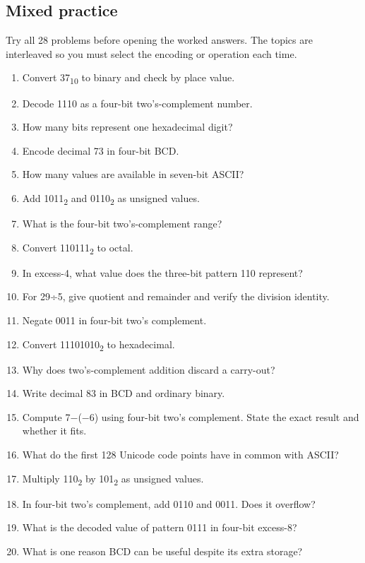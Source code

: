 \documentclass[11pt]{article}
\begin{document}
\begin{keepsection}
\section{Mixed practice}

Try all 28 problems before opening the worked answers. The topics are interleaved so you must select the encoding or operation each time.

\begin{enumerate}
\item Convert 37\textsubscript{10} to binary and check by place value.
\item Decode 1110 as a four-bit two’s-complement number.
\item How many bits represent one hexadecimal digit?
\item Encode decimal 73 in four-bit BCD.
\item How many values are available in seven-bit ASCII?
\item Add 1011\textsubscript{2} and 0110\textsubscript{2} as unsigned values.
\item What is the four-bit two’s-complement range?
\item Convert 110111\textsubscript{2} to octal.
\item In excess-4, what value does the three-bit pattern 110 represent?
\item For 29÷5, give quotient and remainder and verify the division identity.
\item Negate 0011 in four-bit two’s complement.
\item Convert 11101010\textsubscript{2} to hexadecimal.
\item Why does two’s-complement addition discard a carry-out?
\item Write decimal 83 in BCD and ordinary binary.
\item Compute 7\ensuremath{-}(\ensuremath{-}6) using four-bit two’s complement. State the exact result and whether it fits.
\item What do the first 128 Unicode code points have in common with ASCII?
\item Multiply 110\textsubscript{2} by 101\textsubscript{2} as unsigned values.
\item In four-bit two’s complement, add 0110 and 0011. Does it overflow?
\item What is the decoded value of pattern 0111 in four-bit excess-8?
\item What is one reason BCD can be useful despite its extra storage?

\end{enumerate}
\end{keepsection}
\end{document}

